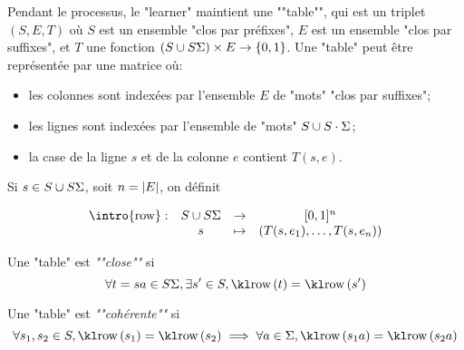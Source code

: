 Pendant le processus, le "learner" maintient une ""table"", qui est un triplet $(S,E,T)$ où $S$ est un ensemble "clos par préfixes",
$E$ est un ensemble "clos par suffixes", et $T$ une fonction $(S \cup S\Sigma) \times E \to \left\{0,1\right\}$. Une "table" peut être
représentée par une matrice où:
\begin{itemize}
	\item les colonnes sont indexées par l'ensemble $E$ de "mots" "clos par suffixes";
	\item les lignes sont indexées par l'ensemble de "mots" $S \cup S\cdot \Sigma$;
	\item la case de la ligne $s$ et de la colonne $e$ contient $T(s,e)$.
\end{itemize}


\begin{definition}
	Si $s \in S \cup S\Sigma$, soit $n = \left|E\right|$, on définit

	$$ \begin{array}{cccc}
			\text{\intro{row}}: & S\cup S\alphabet & \to     & [0,1]^n                       \\
			                    & s                & \mapsto & (T(s,e_1), \ldots, T(s, e_n))
		\end{array}$$


\end{definition}

\begin{definition}
	Une "table" est \emph{""close""} si
	$$ \forall t = sa \in S\alphabet, \exists s'\in S, \row t = \row {s'}$$
\end{definition}

\begin{definition}
	Une "table" est \emph{""cohérente""} si
	$$ \forall s_1, s_2 \in S, \row{s_1} = \row{s_2} \implies \forall a \in \alphabet, \row{s_1a} = \row{s_2a}$$
\end{definition}


